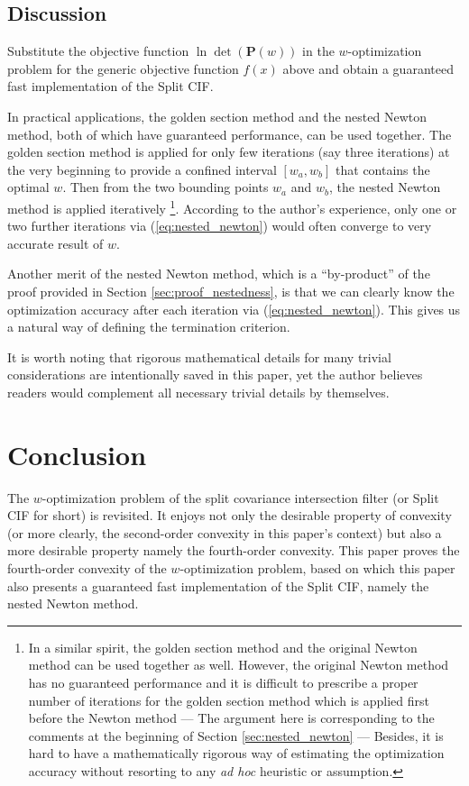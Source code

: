 \documentclass[12pt]{article}
\begin{document}
\subsection{Discussion}

Substitute the objective function $\ln \det(\mathbf{P}(w))$ in the $w$-optimization problem for the generic objective function $f(x)$ above and obtain a guaranteed fast implementation of the Split CIF.

In practical applications, the golden section method and the nested Newton method, both of which have guaranteed performance, can be used together. The golden section method is applied for only few iterations (say three iterations) at the very beginning to provide a confined interval $[w_a, w_b]$ that contains the optimal $w$. Then from the two bounding points $w_a$ and $w_b$, the nested Newton method is applied iteratively
\footnote{In a similar spirit, the golden section method and the original Newton method can be used together as well. However, the original Newton method has no guaranteed performance and it is difficult to prescribe a proper number of iterations for the golden section method which is applied first before the Newton method --- The argument here is corresponding to the comments at the beginning of Section \ref{sec:nested_newton} --- Besides, it is hard to have a mathematically rigorous way of estimating the optimization accuracy without resorting to any \textit{ad hoc} heuristic or assumption.}. 
According to the author's experience, only one or two further iterations via (\ref{eq:nested_newton}) would often converge to very accurate result of $w$.

Another merit of the nested Newton method, which is a ``by-product'' of the proof provided in Section \ref{sec:proof_nestedness}, is that we can clearly know the optimization accuracy after each iteration via (\ref{eq:nested_newton}). This gives us a natural way of defining the termination criterion.

It is worth noting that rigorous mathematical details for many trivial considerations are intentionally saved in this paper, yet the author believes readers would complement all necessary trivial details by themselves. 

\section{Conclusion}

The $w$-optimization problem of the split covariance intersection filter (or Split CIF for short) is revisited. It enjoys not only the desirable property of convexity (or more clearly, the second-order convexity in this paper's context) but also a more desirable property namely the fourth-order convexity. This paper proves the fourth-order convexity of the $w$-optimization problem, based on which this paper also presents a guaranteed fast implementation of the Split CIF, namely the nested Newton method.
\end{document}
